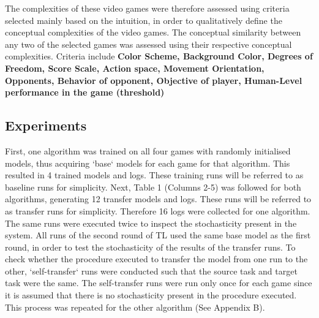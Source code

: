 The complexities of these video games were therefore assessed using criteria selected mainly based on the intuition, in order to qualitatively define the conceptual complexities of the video games. The conceptual similarity between any two of the selected games was assessed using their respective conceptual complexities. Criteria include \textbf{Color Scheme, Background Color, Degrees of Freedom, Score Scale, Action space, Movement Orientation, Opponents, Behavior of opponent, Objective of player, Human-Level performance in the game (threshold)} 

\subsection*{Experiments}
First, one algorithm was trained on all four games with randomly initialised models, thus acquiring `base` models for each game for that algorithm. This resulted in 4 trained models and logs. These training runs will be referred to as baseline runs for simplicity. Next, Table 1 (Columns 2-5) was followed for both algorithms, generating 12 transfer models and logs. These runs will be referred to as transfer runs for simplicity. Therefore 16 logs were collected for one algorithm. The same runs were executed twice to inspect the stochasticity present in the system. All runs of the second round of TL used the same base model as the first round, in order to test the stochasticity of the results of the transfer runs. To check whether the procedure executed to transfer the model from one run to the other, `self-transfer` runs were conducted such that the source task and target task were the same. The self-transfer runs were run only once for each game since it is assumed that there is no stochasticity present in the procedure executed. This process was repeated for the other algorithm (See Appendix B). 

